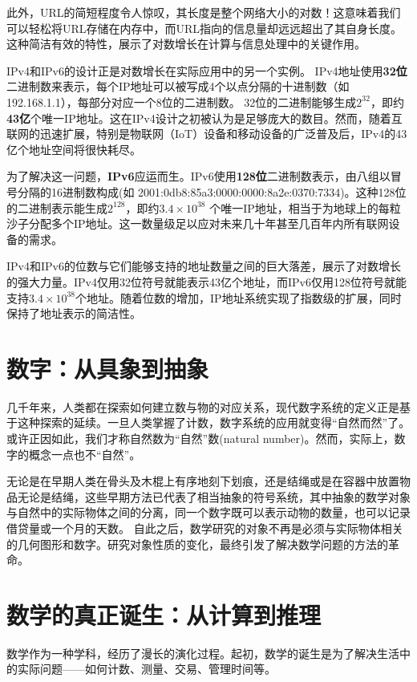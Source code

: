 此外，URL的简短程度令人惊叹，其长度是整个网络大小的对数！这意味着我们可以轻松将URL存储在内存中，而URL指向的信息量却远远超出了其自身长度。
这种简洁有效的特性，展示了对数增长在计算与信息处理中的关键作用。

IPv4和IPv6的设计正是对数增长在实际应用中的另一个实例。
 IPv4地址使用{\bf 32位}二进制数来表示，每个IP地址可以被写成4个以点分隔的十进制数（如192.168.1.1），每部分对应一个8位的二进制数。
32位的二进制能够生成$2^{32}$，即约{\bf 43亿}个唯一IP地址。这在IPv4设计之初被认为是足够庞大的数目。然而，随着互联网的迅速扩展，特别是物联网（IoT）设备和移动设备的广泛普及后，IPv4的43亿个地址空间将很快耗尽。

   为了解决这一问题，{\bf IPv6}应运而生。IPv6使用{\bf 128位}二进制数表示，由八组以冒号分隔的16进制数构成(如 2001:0db8:85a3:0000:0000:8a2e:0370:7334)。这种128位的二进制表示能生成$2^{128}$，即约{\bf $3.4 \times 10^{38} $} 个唯一IP地址，相当于为地球上的每粒沙子分配多个IP地址。这一数量级足以应对未来几十年甚至几百年内所有联网设备的需求。
   
IPv4和IPv6的位数与它们能够支持的地址数量之间的巨大落差，展示了对数增长的强大力量。IPv4仅用32位符号就能表示43亿个地址，而IPv6仅用128位符号就能支持{\bf $3.4 \times 10^{38}$}个地址。随着位数的增加，IP地址系统实现了指数级的扩展，同时保持了地址表示的简洁性。


\section{数字：从具象到抽象}
几千年来，人类都在探索如何建立数与物的对应关系，现代数字系统的定义正是基于这种探索的延续。一旦人类掌握了计数，数字系统的应用就变得“自然而然”了。或许正因如此，我们才称自然数为“自然”数(natural number)。然而，实际上，数字的概念一点也不“自然”。

无论是在早期人类在骨头及木棍上有序地刻下划痕，还是结绳或是在容器中放置物品无论是结绳，这些早期方法已代表了相当抽象的符号系统，其中抽象的数学对象与自然中的实际物体之间的分离，同一个数字既可以表示动物的数量，也可以记录借贷量或一个月的天数。
自此之后，数学研究的对象不再是必须与实际物体相关的几何图形和数字。研究对象性质的变化，最终引发了解决数学问题的方法的革命。

\section{数学的真正诞生：从计算到推理}
数学作为一种学科，经历了漫长的演化过程。起初，数学的诞生是为了解决生活中的实际问题——如何计数、测量、交易、管理时间等。

